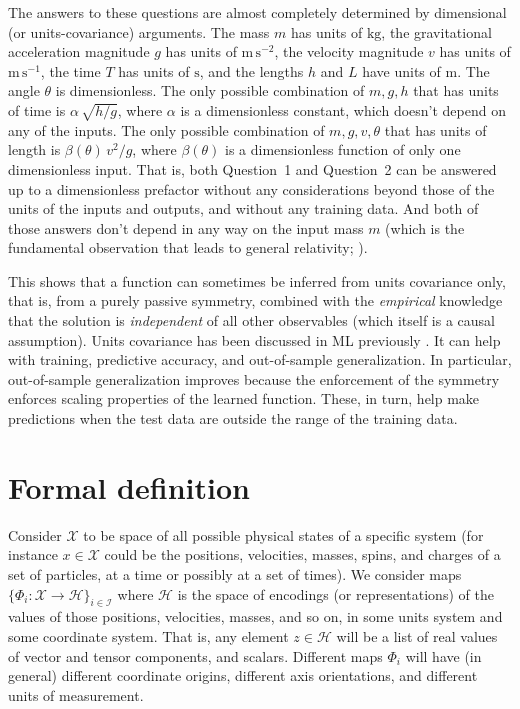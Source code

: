 \documentclass{article} %
\renewcommand{\mathcal}[1]{\mathscr{#1}} %
\newcommand{\unit}[1]{\mathrm{#1}}
\newcommand{\kg}{\unit{kg}}
\newcommand{\m}{\unit{m}}
\newcommand{\s}{\unit{s}}
\begin{document}
The answers to these questions are almost completely determined by dimensional (or units-covariance) arguments.
The mass $m$ has units of $\kg$, the gravitational acceleration magnitude $g$ has units of $\m\,\s^{-2}$, the velocity magnitude $v$ has units of $\m\,\s^{-1}$, the time $T$ has units of $\s$, and the lengths $h$ and $L$ have units of $\m$.
The angle $\theta$ is dimensionless.
The only possible combination of $m, g, h$ that has units of time is $\alpha\,\sqrt{h/g}$, where $\alpha$ is a dimensionless constant, which doesn't depend on any of the inputs.
The only possible combination of $m, g, v, \theta$ that has units of length is $\beta(\theta)\,v^2/g$, where $\beta(\theta)$ is a dimensionless function of only one dimensionless input.
That is, both Question~1 and Question~2 can be answered up to a dimensionless prefactor without any considerations beyond those of the units of the inputs and outputs, and without any training data.
And both of those answers don't depend in any way on the input mass $m$ (which is the fundamental observation that leads to general relativity; \citealt{gr}).

This shows that a function can sometimes be inferred from units covariance only, that is, from a purely passive symmetry, combined with the \emph{empirical} knowledge that the solution is \emph{independent} of all other observables (which itself is a causal assumption).
Units covariance has been discussed in ML previously \citep{villar2022dimensionless, bakarji2022dimensionally, xie2022data}.
It can help with training, predictive accuracy, and out-of-sample generalization.
In particular, out-of-sample generalization improves because the enforcement of the symmetry enforces scaling properties of the learned function.
These, in turn, help make predictions when the test data are outside the range of the training data.

\section{Formal definition}\label{sec:definitions}
Consider $\mathcal{X}$ to be space of all possible physical states of a specific system (for instance $x\in \mathcal X$ could be the positions, velocities, masses, spins, and charges of a set of particles, at a time or possibly at a set of times).
We consider maps $\{\Phi_i: \mathcal{X} \to \mathcal{H}\}_{i\in \mathcal{I}}$ where $\mathcal{H}$ is the space of encodings (or representations) of the values of those positions, velocities, masses, and so on, in some units system and some coordinate system.
That is, any element $z\in \mathcal{H}$ will be a list of real values of vector and tensor components, and scalars.
Different maps $\Phi_i$ will have (in general) different coordinate origins, different axis orientations, and different units of measurement.
\end{document}
